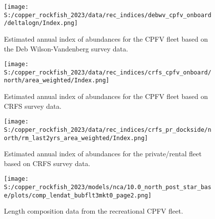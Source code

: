\documentclass[11pt,
  letterpaper,
]{article}
\begin{document}
\pagebreak

\begin{figure}
{\centering
\texttt{[image: S:/copper\_rockfish\_2023/data/rec\_indices/debwv\_cpfv\_onboard/deltalogn/Index.png]}
}
\caption{Estimated annual index of abundances for the CPFV fleet based on the Deb Wilson-Vandenberg survey data.\label{fig:dwv-index-main}}
\end{figure}

\pagebreak

\begin{figure}
{\centering
\texttt{[image: S:/copper\_rockfish\_2023/data/rec\_indices/crfs\_cpfv\_onboard/north/area\_weighted/Index.png]}
}
\caption{Estimated annual index of abundances for the CPFV fleet based on CRFS survey data.\label{fig:crfs-index-main}}
\end{figure}

\pagebreak

\begin{figure}
{\centering
\texttt{[image: S:/copper\_rockfish\_2023/data/rec\_indices/crfs\_pr\_dockside/north/rm\_last2yrs\_area\_weighted/Index.png]}
}
\caption{Estimated annual index of abundances for the private/rental fleet based on CRFS survey data.\label{fig:crfs-pr-index-main}}
\end{figure}

\pagebreak

\begin{figure}
{\centering
\texttt{[image: S:/copper\_rockfish\_2023/models/nca/10.0\_north\_post\_star\_base/plots/comp\_lendat\_bubflt3mkt0\_page2.png]}
}
\caption{Length composition data from the recreational CPFV fleet.\label{fig:rec-cpfv-len-data}}
\end{figure}
\end{document}
